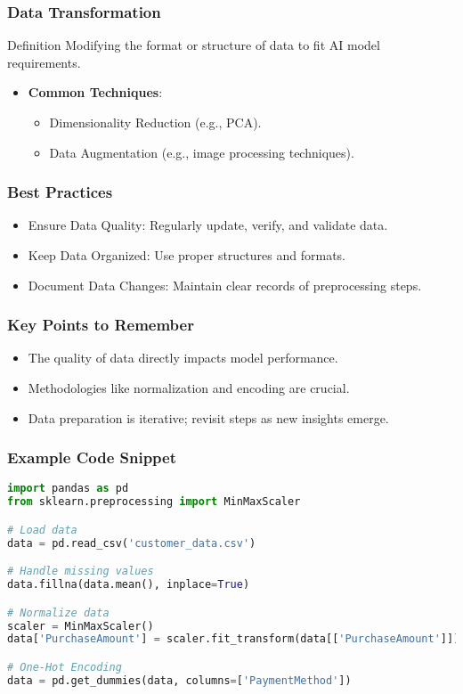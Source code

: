 \documentclass[aspectratio=169]{beamer}
\begin{document}
\begin{frame}[fragile]
    \frametitle{Data Transformation}
    \begin{block}{Definition}
        Modifying the format or structure of data to fit AI model requirements.
    \end{block}
    \begin{itemize}
        \item \textbf{Common Techniques}:
        \begin{itemize}
            \item Dimensionality Reduction (e.g., PCA).
            \item Data Augmentation (e.g., image processing techniques).
        \end{itemize}
    \end{itemize}
\end{frame}

\begin{frame}[fragile]
    \frametitle{Best Practices}
    \begin{itemize}
        \item Ensure Data Quality: Regularly update, verify, and validate data.
        \item Keep Data Organized: Use proper structures and formats.
        \item Document Data Changes: Maintain clear records of preprocessing steps.
    \end{itemize}
\end{frame}

\begin{frame}[fragile]
    \frametitle{Key Points to Remember}
    \begin{itemize}
        \item The quality of data directly impacts model performance.
        \item Methodologies like normalization and encoding are crucial.
        \item Data preparation is iterative; revisit steps as new insights emerge.
    \end{itemize}
\end{frame}

\begin{frame}[fragile]
    \frametitle{Example Code Snippet}
    \begin{lstlisting}[language=Python]
import pandas as pd
from sklearn.preprocessing import MinMaxScaler

# Load data
data = pd.read_csv('customer_data.csv')

# Handle missing values
data.fillna(data.mean(), inplace=True)

# Normalize data
scaler = MinMaxScaler()
data['PurchaseAmount'] = scaler.fit_transform(data[['PurchaseAmount']])

# One-Hot Encoding
data = pd.get_dummies(data, columns=['PaymentMethod'])
    \end{lstlisting}
\end{frame}
\end{document}
